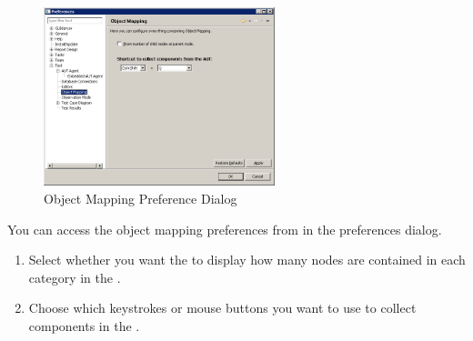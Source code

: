

\begin{figure}[h]
\begin{center}
\includegraphics[width=0.6\textwidth]{Tasks/Preferences/PS/objectmappingprefs}
\caption{Object Mapping Preference Dialog}
\label{objectmappingprefs}
\end{center}
\end{figure}

You can access the object mapping preferences from  in the preferences dialog. 
\begin{enumerate}
\item Select whether you want the \ite{} to display how many nodes are contained in each category in the \gdomeditor{}. 
\item Choose which keystrokes or mouse buttons you want to use to collect components in the \gdomm{}.  
\end{enumerate}

